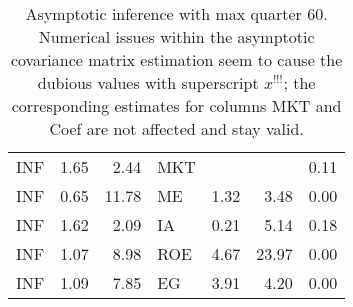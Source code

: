 \documentclass[12pt]{article}
\begin{document}
\begin{table}[ht]
\begin{tabular}{lrrlrrr}
		\hline
		INF & 1.65 & 2.44 & MKT &  &  & 0.11 \\ 
		INF & 0.65 & 11.78 & ME & 1.32 & 3.48 & 0.00 \\ 
		INF & 1.62 & 2.09 & IA & 0.21 & 5.14 & 0.18 \\ 
		INF & 1.07 & 8.98 & ROE & 4.67 & 23.97 & 0.00 \\ 
		INF & 1.09 & 7.85 & EG & 3.91 & 4.20 & 0.00 \\ 
		\hline
		\hline
	\end{tabular}
	\caption{
		Asymptotic inference with max quarter 60.
		Numerical issues within the asymptotic covariance matrix estimation seem to cause the dubious values with superscript $x^{!!!}$; the corresponding estimates for columns MKT and Coef are not affected and stay valid.
	} 
\end{table}
\end{document}
